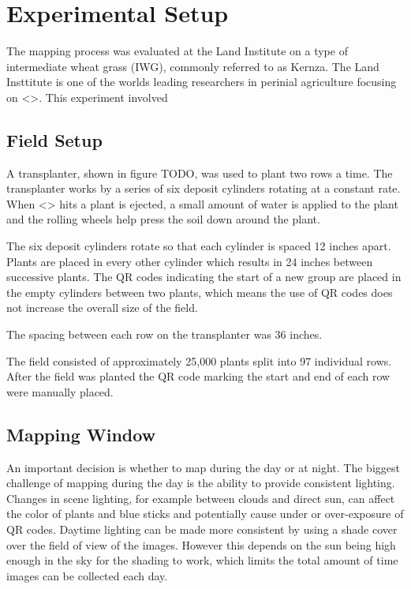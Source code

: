 
\cleardoublepage

\chapter{Experimental Setup}
\label{experiment}

The mapping process was evaluated at the Land Institute on a type of intermediate wheat grass (IWG), commonly referred to as Kernza.  The Land Insttitute is one of the worlds leading researchers in perinial agriculture focusing on <>. This experiment involved


\section{Field Setup}
\label{experiment-field}

A transplanter, shown in figure TODO, was used to plant two rows a time.  The transplanter works by a series of six deposit cylinders rotating at a constant rate.  When <> hits a plant is ejected, a small amount of water is applied to the plant and the rolling wheels help press the soil down around the plant.  

The six deposit cylinders rotate so that each cylinder is spaced 12 inches apart.  Plants are placed in every other cylinder which results in 24 inches between successive plants.  The QR codes indicating the start of a new group are placed in the empty cylinders between two plants, which means the use of QR codes does not increase the overall size of the field. 
 
The spacing between each row on the transplanter was 36 inches. 

The field consisted of approximately 25,000 plants split into 97 individual rows.  After the field was planted the QR code marking the start and end of each row were manually placed.



\section{Mapping Window}

An important decision is whether to map during the day or at night.  The biggest challenge of mapping during the day is the ability to provide consistent lighting.  Changes in scene lighting, for example between clouds and direct sun, can affect the color of plants and blue sticks and potentially cause under or over-exposure of QR codes.  Daytime lighting can be made more consistent by using a shade cover over the field of view of the images.  However this depends on the sun being high enough in the sky for the shading to work, which limits the total amount of time images can be collected each day.  

